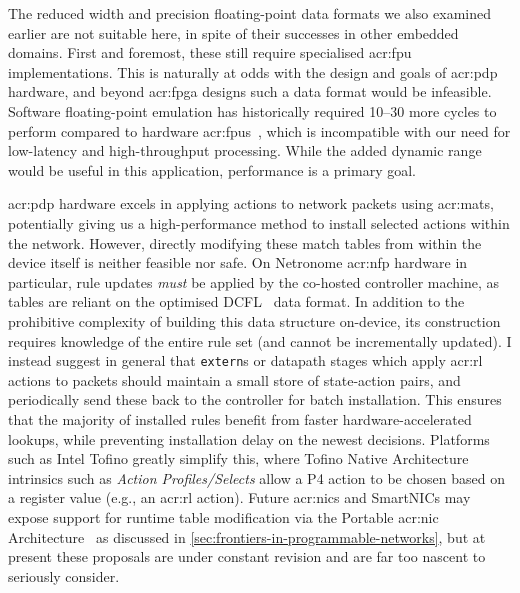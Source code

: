 The reduced width and precision floating-point data formats we also examined earlier are not suitable here, in spite of their successes in other embedded domains.
First and foremost, these still require specialised \gls{acr:fpu} implementations.
This is naturally at odds with the design and goals of \gls{acr:pdp} hardware, and beyond \gls{acr:fpga} designs such a data format would be infeasible.
Software floating-point emulation has historically required \qtyrange{10}{30}{\times} more cycles to perform compared to hardware \glspl{acr:fpu}~\parencite{DBLP:conf/arith/IordacheT03}, which is incompatible with our need for low-latency and high-throughput processing.
While the added dynamic range would be useful in this application, performance is a primary goal.

\gls{acr:pdp} hardware excels in applying actions to network packets using \glspl{acr:mat}, potentially giving us a high-performance method to install selected actions within the network.
However, directly modifying these match tables from within the device itself is neither feasible nor safe.
On Netronome \gls{acr:nfp} hardware in particular, rule updates \emph{must} be applied by the co-hosted controller machine, as tables are reliant on the optimised DCFL~\parencite{DBLP:conf/infocom/TaylorT05} data format.
In addition to the prohibitive complexity of building this data structure on-device, its construction requires knowledge of the entire rule set (and cannot be incrementally updated).
I instead suggest in general that \texttt{extern}s or datapath stages which apply \gls{acr:rl} actions to packets should maintain a small store of state-action pairs, and periodically send these back to the controller for batch installation.
This ensures that the majority of installed rules benefit from faster hardware-accelerated lookups, while preventing installation delay on the newest decisions.
Platforms such as Intel Tofino greatly simplify this, where Tofino Native Architecture intrinsics such as \emph{Action Profiles/Selects} allow a P4 action to be chosen based on a register value (e.g., an \gls{acr:rl} action).
Future \glspl{acr:nic} and SmartNICs may expose support for runtime table modification via the Portable \gls{acr:nic} Architecture~\parencite{p4-pna} as discussed in \cref{sec:frontiers-in-programmable-networks}, but at present these proposals are under constant revision and are far too nascent to seriously consider.

